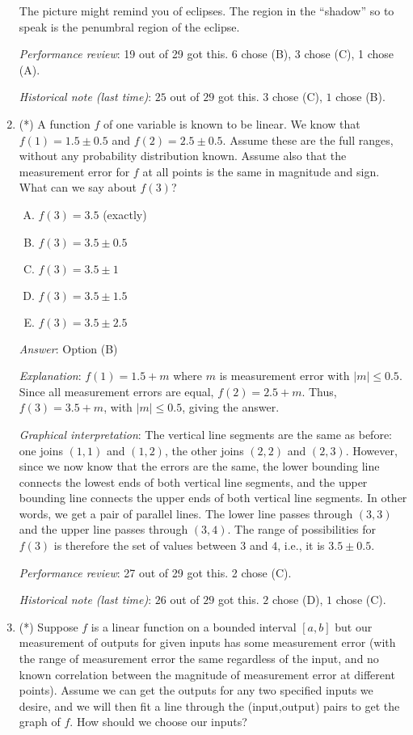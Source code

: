 \documentclass[10pt]{amsart}
\begin{document}
\begin{enumerate}
  The picture might remind you of eclipses. The region in the
  ``shadow'' so to speak is the penumbral region of the eclipse.

  {\em Performance review}: 19 out of 29 got this. 6 chose (B), 3
  chose (C), 1 chose (A).

  {\em Historical note (last time)}: $25$ out of $29$ got this. $3$ chose (C),
  $1$ chose (B).
\item (*) A function $f$ of one variable is known to be linear. We know
  that $f(1) = 1.5 \pm 0.5$ and $f(2) = 2.5 \pm 0.5$. Assume these are
  the full ranges, without any probability distribution known. Assume
  also that the measurement error for $f$ at all points is the same in
  magnitude and sign. What can we say about $f(3)$?

  \begin{enumerate}[(A)]
  \item $f(3) = 3.5$ (exactly)
  \item $f(3) = 3.5 \pm 0.5$
  \item $f(3) = 3.5 \pm 1$
  \item $f(3) = 3.5 \pm 1.5$
  \item $f(3) = 3.5 \pm 2.5$
  \end{enumerate}

  {\em Answer}: Option (B)

  {\em Explanation}: $f(1) = 1.5 + m$ where $m$ is measurement error
  with $|m| \le 0.5$. Since all measurement errors are equal, $f(2) =
  2.5 + m$. Thus, $f(3) = 3.5 + m$, with $|m| \le 0.5$, giving the
  answer.

  {\em Graphical interpretation}: The vertical line segments are the
  same as before: one joins $(1,1)$ and $(1,2)$, the other joins
  $(2,2)$ and $(2,3)$. However, since we now know that the errors are
  the same, the lower bounding line connects the lowest ends of both
  vertical line segments, and the upper bounding line connects the
  upper ends of both vertical line segments. In other words, we get a
  pair of parallel lines. The lower line passes through $(3,3)$ and
  the upper line passes through $(3,4)$. The range of possibilities
  for $f(3)$ is therefore the set of values between $3$ and $4$, i.e.,
  it is $3.5 \pm 0.5$.

  {\em Performance review}: 27 out of 29 got this. 2 chose (C).
 
  {\em Historical note (last time)}: $26$ out of $29$ got this. $2$ chose (D),
  $1$ chose (C).
\item (*) Suppose $f$ is a linear function on a bounded interval $[a,b]$
  but our measurement of outputs for given inputs has some measurement
  error (with the range of measurement error the same regardless of
  the input, and no known correlation between the magnitude of
  measurement error at different points). Assume we can get the
  outputs for any two specified inputs we desire, and we will then fit
  a line through the (input,output) pairs to get the graph of $f$. How
  should we choose our inputs?


\end{enumerate}
\end{document}
